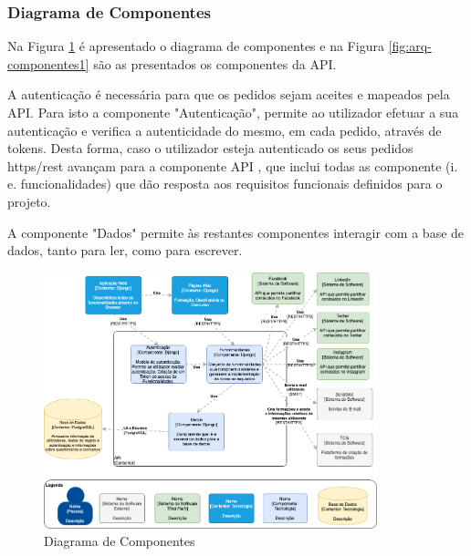\subsubsection{Diagrama de Componentes}

Na Figura \ref{fig:arq-componentes} é apresentado o diagrama de componentes e na Figura \ref{fig:arq-componentes1} são as presentados os componentes da API. 

A autenticação é necessária para que os pedidos sejam aceites e mapeados pela API. Para isto a componente "Autenticação", permite ao utilizador efetuar a sua autenticação e verifica a autenticidade do mesmo, em cada pedido, através de tokens. Desta forma, caso o utilizador esteja autenticado os seus pedidos \acrshort{https}/\acrshort{rest} avançam para a componente API , que inclui todas as componente (i. e. funcionalidades) que dão resposta aos requisitos funcionais definidos para o projeto.

A componente "Dados" permite às restantes componentes interagir com a base de dados, tanto para ler, como para escrever.


\begin{figure}[ht!]
	\begin{center}
		\includegraphics[width=0.86\textwidth]{img/arq/diagrama-componentes}
		\caption{Diagrama de Componentes}
		\label{fig:arq-componentes}
	\end{center}
\end{figure}

